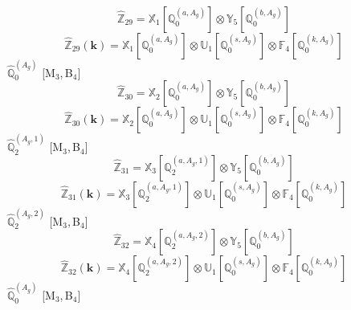 \documentclass[fleqn,10pt,landscape]{article}
\begin{document}
\begin{itemize}
\begin{dmath*}
\hat{\mathbb{Z}}_{29}=\mathbb{X}_{1}[\mathbb{Q}_{0}^{(a,A_{g})}] \otimes\mathbb{Y}_{5}[\mathbb{Q}_{0}^{(b,A_{g})}]
\end{dmath*}
\begin{dmath*}
\hat{\mathbb{Z}}_{29}(\bm{k})=\mathbb{X}_{1}[\mathbb{Q}_{0}^{(a,A_{g})}] \otimes\mathbb{U}_{1}[\mathbb{Q}_{0}^{(s,A_{g})}] \otimes\mathbb{F}_{4}[\mathbb{Q}_{0}^{(k,A_{g})}]
\end{dmath*}
\vspace{4mm}
\noindent {} $\,\,\,\hat{\mathbb{Q}}_{0}^{(A_{g})}$ [M$_{3}$,\,B$_{4}$]
\begin{dmath*}
\hat{\mathbb{Z}}_{30}=\mathbb{X}_{2}[\mathbb{Q}_{0}^{(a,A_{g})}] \otimes\mathbb{Y}_{5}[\mathbb{Q}_{0}^{(b,A_{g})}]
\end{dmath*}
\begin{dmath*}
\hat{\mathbb{Z}}_{30}(\bm{k})=\mathbb{X}_{2}[\mathbb{Q}_{0}^{(a,A_{g})}] \otimes\mathbb{U}_{1}[\mathbb{Q}_{0}^{(s,A_{g})}] \otimes\mathbb{F}_{4}[\mathbb{Q}_{0}^{(k,A_{g})}]
\end{dmath*}
\vspace{4mm}
\noindent {} $\,\,\,\hat{\mathbb{Q}}_{2}^{(A_{g},1)}$ [M$_{3}$,\,B$_{4}$]
\begin{dmath*}
\hat{\mathbb{Z}}_{31}=\mathbb{X}_{3}[\mathbb{Q}_{2}^{(a,A_{g},1)}] \otimes\mathbb{Y}_{5}[\mathbb{Q}_{0}^{(b,A_{g})}]
\end{dmath*}
\begin{dmath*}
\hat{\mathbb{Z}}_{31}(\bm{k})=\mathbb{X}_{3}[\mathbb{Q}_{2}^{(a,A_{g},1)}] \otimes\mathbb{U}_{1}[\mathbb{Q}_{0}^{(s,A_{g})}] \otimes\mathbb{F}_{4}[\mathbb{Q}_{0}^{(k,A_{g})}]
\end{dmath*}
\vspace{4mm}
\noindent {} $\,\,\,\hat{\mathbb{Q}}_{2}^{(A_{g},2)}$ [M$_{3}$,\,B$_{4}$]
\begin{dmath*}
\hat{\mathbb{Z}}_{32}=\mathbb{X}_{4}[\mathbb{Q}_{2}^{(a,A_{g},2)}] \otimes\mathbb{Y}_{5}[\mathbb{Q}_{0}^{(b,A_{g})}]
\end{dmath*}
\begin{dmath*}
\hat{\mathbb{Z}}_{32}(\bm{k})=\mathbb{X}_{4}[\mathbb{Q}_{2}^{(a,A_{g},2)}] \otimes\mathbb{U}_{1}[\mathbb{Q}_{0}^{(s,A_{g})}] \otimes\mathbb{F}_{4}[\mathbb{Q}_{0}^{(k,A_{g})}]
\end{dmath*}
\vspace{4mm}
\noindent {} $\,\,\,\hat{\mathbb{Q}}_{0}^{(A_{g})}$ [M$_{3}$,\,B$_{4}$]
\begin{dmath*}

\end{dmath*}
\end{itemize}
\end{document}
